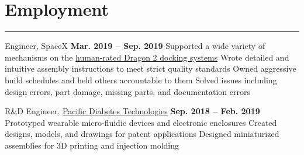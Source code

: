 \section{Employment}
\noindent\rule{\textwidth}{\hlinewidth}

\begin{innerlist}
	\item Engineer, SpaceX 
		\hfill\textbf{Mar. 2019 -- Sep. 2019}
		\subitem Supported a wide variety of mechanisms on the \href{https://en.wikipedia.org/wiki/Dragon_2}{human-rated Dragon 2 docking systems}
		\subitem Wrote detailed and intuitive assembly instructions to meet strict quality standards
		\subitem Owned aggressive build schedules and held others accountable to them
		\subitem Solved issues including design errors, part damage, missing parts, and documentation errors
    \item R\&D Engineer, \href{http://pacificdt.com/}{Pacific Diabetes Technologies} 
		\hfill\textbf{Sep. 2018 -- Feb. 2019} %
        \subitem Prototyped wearable micro-fluidic devices and electronic enclosures
		\subitem Created designs, models, and drawings for patent applications
		\subitem Designed miniaturized assemblies for 3D printing and injection molding
\end{innerlist}
\vfill
